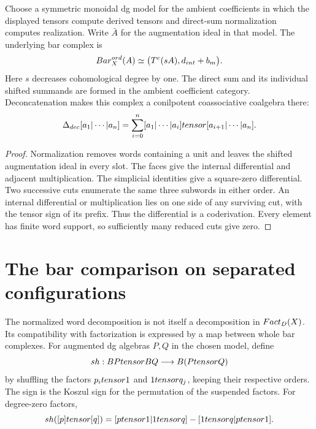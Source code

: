 \begin{theorem}
Choose a symmetric monoidal dg model for the ambient coefficients in which the displayed
tensors compute derived tensors and direct-sum normalization computes realization.
Write $\bar A$ for the augmentation ideal in that model.
The underlying bar complex is
\[
 Bar_X^{ord}(A)\simeq
 \bigl(T^c(sA),d_{int}+b_m\bigr).
\]
Here $s$ decreases cohomological degree by one.
The direct sum and its individual shifted summands are formed in the ambient coefficient category.
Deconcatenation makes this complex a conilpotent coassociative coalgebra there:
\[
 \Delta_{dec}[a_1|\cdots|a_n]
 =\sum_{i=0}^n[a_1|\cdots|a_i]tensor[a_{i+1}|\cdots|a_n].
\]
\end{theorem}
\begin{proof}
Normalization removes words containing a unit and leaves the shifted augmentation ideal in every slot.
The faces give the internal differential and adjacent multiplication.
The simplicial identities give a square-zero differential.
Two successive cuts enumerate the same three subwords in either order.
An internal differential or multiplication lies on one side of any surviving cut,
with the tensor sign of its prefix. Thus the differential is a coderivation.
Every element has finite word support, so sufficiently many reduced cuts give zero.
\end{proof}

\section{The bar comparison on separated configurations}
The normalized word decomposition is not itself a decomposition in $Fact_D(X)$.
Its compatibility with factorization is expressed by a map between whole bar complexes.
For augmented dg algebras $P,Q$ in the chosen model, define
\[
 sh:BPtensor BQ\longrightarrow B(Ptensor Q)
\]
by shuffling the factors $p_itensor1$ and $1tensor q_j$,
keeping their respective orders.
The sign is the Koszul sign for the permutation of the suspended factors.
For degree-zero factors,
\[
 sh([p]tensor[q])
 =[ptensor1|1tensor q]-[1tensor q|ptensor1].
\]


